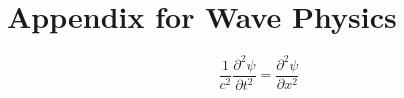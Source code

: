 \chapter{Appendix for Wave Physics}

\begin{equation}
\frac{1}{c^2}\frac{\partial^2\psi}{\partial t^2}=\frac{\partial^2\psi}{\partial x^2}
\label{eq:wave}
\end{equation}
